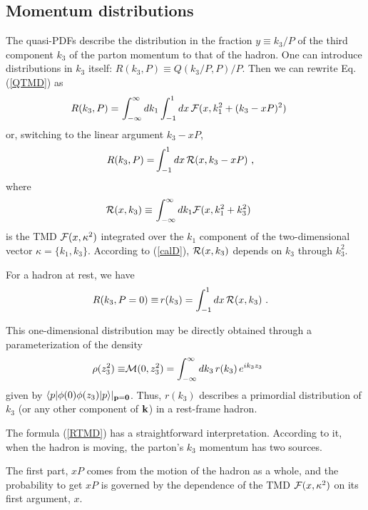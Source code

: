 \subsection{Momentum distributions}

The quasi-PDFs describe the distribution in the fraction $y \equiv k_3/P$ of the
third component $k_3$ of the parton momentum to that of the hadron.
One can introduce distributions in $k_3$ itself:
$R (k_3,P) \equiv Q(k_3/P,P)/P$.
Then we can rewrite Eq. (\ref{QTMD}) as
\begin{align}
R(k_3, P)  =  & \,\int_{-\infty}^{\infty} d  k_1
\int_{-1} ^ {1} d  x \,   {\cal F} (x, k_1^2+(k_3-xP)^2 )
\
\label{RTMD0}
\end{align}
or, switching to the linear argument \mbox{$k_3-xP$,}
\begin{align}
R(k_3, P)  =  &  \int_{-1}^1 dx\,   {\cal R} (x, k_3-xP)
\  ,
\label{RTMD}
\end{align}
where
\begin{align}
{\cal R} (x, k_3  )   \equiv   & \,\int_{-\infty}^{\infty} d  k_1
{\cal F} (x, k_1^2+k_3^2)
\
\label{calD}
\end{align}
is the TMD $ {\cal F} (x, \kappa^2)$ integrated over the $k_1$ component
of
the two-dimensional vector $\kappa=\{k_1,k_3\}$.
According to (\ref{calD}), ${\cal R} (x, k_3  ) $ depends on $k_3$ through $k_3^2$.

For a hadron at rest, we have
\begin{align}
R(k_3, P=0)  \equiv   &\, r(k_3)=
\int_{-1}^1 dx\,   {\cal R} (x, k_3  )
\  .
\label{DTMDsmall}
\end{align}

This one-dimensional distribution may be directly obtained through a parameterization
of the density
\begin{align}
\rho (z_3^2) \equiv & {\cal M} (0,z_3^2) =
\int_{-\infty}^{\infty}   dk_3 \,
r(k_3)  \,  e^{i k_3 z_3 } \,
\
\label{dk3}
\end{align}
given by $  \langle p |   \phi(0) \phi ( z_3 )|p \rangle |_{ {\bf p} = {\bf 0} } $.
Thus, $r(k_3)$ describes a primordial distribution of $k_3$
(or any other component of ${\bf k}$) in
a rest-frame hadron.

The formula (\ref{RTMD}) has a straightforward interpretation.
According to it, when the hadron is moving, the parton's $k_3$ momentum
has two sources.

The first part, $xP$ comes from the motion
of the hadron as a whole, and the probability to get $xP$ is governed by the dependence of
the TMD ${\cal F} (x, \kappa^2)$ on its first argument, $x$.

